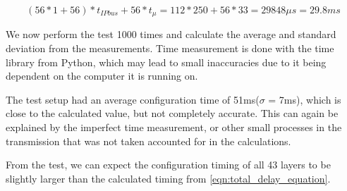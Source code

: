 \documentclass[main.tex]{subfiles}
\begin{document}
\begin{equation} \label{eqn:one_layer_delay}
(56*1+56)*t_{IPbus}+56*t_{\mu }= 112 * 250 + 56*33 =  29848\mu s = 29.8 ms
\end{equation}

We now perform the test 1000 times and calculate the average and standard deviation from the measurements. Time measurement is done with the time library from Python, which may lead to small inaccuracies due to it being dependent on the computer it is running on.

The test setup had an average configuration time of 51ms($\sigma$ = 7ms), which is close to the calculated value, but not completely accurate. This can again be explained by the imperfect time measurement, or other small processes in the transmission that was not taken accounted for in the calculations.

From the test, we can expect the configuration timing of all 43 layers to be slightly larger than the calculated timing from \autoref{eqn:total_delay_equation}.



\end{document}
